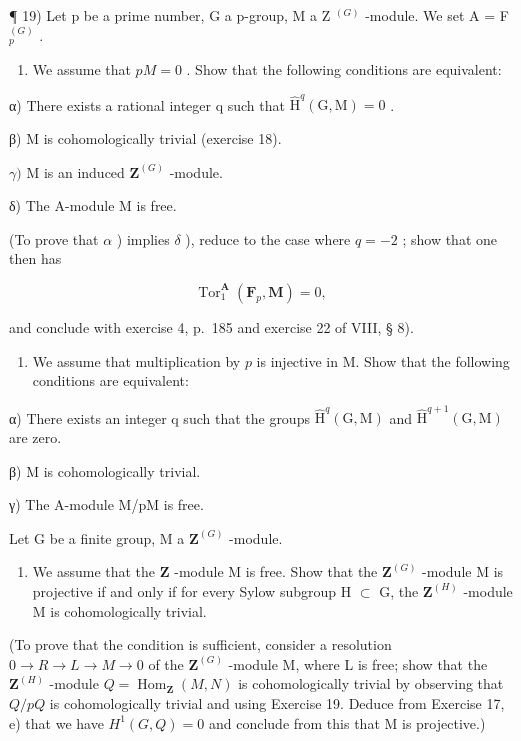 ¶ 19) Let p be a prime number, G a p-group, M a Z \(^{(G)}\) -module. We set A = F \(_{p}^{(G)}\) .

\begin{enumerate}
\def\labelenumi{\alph{enumi})}
\tightlist
\item
  We assume that \(pM = 0\) . Show that the following conditions are equivalent:
\end{enumerate}

α) There exists a rational integer q such that \(\hat{\mathrm{H}}^{q}(\mathrm{G},\mathrm{M})=0\) .

β) M is cohomologically trivial (exercise 18).

\(\gamma)\) M is an induced \(\mathbf{Z}^{(G)}\) -module.

δ) The A-module M is free.

(To prove that \(\alpha\) ) implies \(\delta\) ), reduce to the case where \(q = -2\) ; show that one then has

\[
\operatorname{Tor} _ {1} ^ {\mathbf {A}} \left(\mathbf {F} _ {p}, \mathbf {M}\right) = 0,
\]

and conclude with exercise 4, p.~185 and exercise 22 of VIII, § 8).

\begin{enumerate}
\def\labelenumi{\alph{enumi})}
\setcounter{enumi}{1}
\tightlist
\item
  We assume that multiplication by \(p\) is injective in M. Show that the following conditions are equivalent:
\end{enumerate}

α) There exists an integer q such that the groups \(\hat{\mathrm{H}}^{q}(\mathrm{G},\mathrm{M})\) and \(\hat{\mathrm{H}}^{q+1}(\mathrm{G},\mathrm{M})\) are zero.

β) M is cohomologically trivial.

γ) The A-module M/pM is free.

Let G be a finite group, M a \(\mathbf{Z}^{(G)}\) -module.

\begin{enumerate}
\def\labelenumi{\alph{enumi})}
\tightlist
\item
  We assume that the \(\mathbf{Z}\) -module M is free. Show that the \(\mathbf{Z}^{(G)}\) -module M is projective if and only if for every Sylow subgroup H \(\subset\) G, the \(\mathbf{Z}^{(H)}\) -module M is cohomologically trivial.
\end{enumerate}

(To prove that the condition is sufficient, consider a resolution \(0 \to R \to L \to M \to 0\) of the \(\mathbf{Z}^{(G)}\) -module M, where L is free; show that the \(\mathbf{Z}^{(H)}\) -module \(Q = \operatorname{Hom}_{\mathbf{Z}}(M, N)\) is cohomologically trivial by observing that \(Q/pQ\) is cohomologically trivial and using Exercise 19. Deduce from Exercise 17, e) that we have \(H^1(G, Q) = 0\) and conclude from this that M is projective.)

